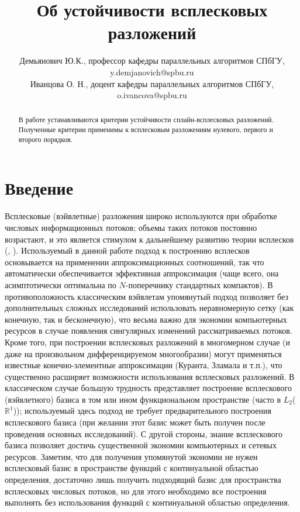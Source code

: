 \documentclass{spisok-article}
\title{Об устойчивости всплесковых разложений}
\author{Демьянович Ю.К., профессор кафедры параллельных алгоритмов СПбГУ, y.demjanovich@spbu.ru\\
  Иванцова О. Н., доцент кафедры параллельных алгоритмов СПбГУ, o.ivancova@spbu.ru
}
\begin{document}
\maketitle

\begin{abstract}
В работе устанавливаются критерии устойчивости сплайн-всплесковых разложений. Полученные критерии применимы к всплесковым разложениям нулевого, первого и второго порядков.
\end{abstract}


\def\defabove{\raise3pt\hbox {${{\lower2pt  \hbox {${\scriptscriptstyle {\rm def}}$}}}  \atop = $}}

\def\aa{\hbox{\rm \bf a}}
\def\bb{\hbox{\rm \bf b}}
\def\cc{\hbox{\rm \bf c}}



\section{Введение}

Всплесковые (вэйвлетные) разложения широко используются при обработке числовых информационных потоков; объемы таких потоков постоянно возрастают, и это является стимулом к дальнейшему развитию теории всплесков (\cite{dem2003}, \cite{dem2013}). Используемый в данной работе подход к построению всплесков основывается на применении аппроксимационных соотношений, так что автоматически обеспечивается эффективная аппроксимация (чаще всего, она асимптотически оптимальна по $N$-поперечнику стандартных компактов). В противоположность классическим вэйвлетам  упомянутый подход позволяет без дополнительных сложных исследований использовать неравномерную сетку (как конечную, так и бесконечную), что весьма важно для экономии компьютерных ресурсов в случае появления сингулярных изменений рассматриваемых потоков. Кроме того, при построении всплесковых разложений в многомерном случае (и даже на произвольном дифференцируемом многообразии) могут применяться известные конечно-элементные аппроксимации (Куранта, Зламала и т.п.), что существенно расширяет возможности использования всплесковых разложений. В классическом случае большую трудность представляет построение всплескового (вэйвлетного) базиса в том или ином функциональном пространстве (часто в $L_2$(${  \mathbb{\mathbb{R}}}^1$)); используемый здесь подход не требует предварительного построения всплескового базиса (при желании этот базис может быть получен после проведения основных исследований). С другой стороны, знание всплескового базиса позволяет достичь существенной экономии компьютерных и сетевых ресурсов. Заметим, что для получения упомянутой экономии не нужен всплесковый базис в пространстве функций с континуальной областью определения, достаточно лишь получить подходящий базис для пространства всплесковых числовых потоков, но для этого необходимо все построения выполнять без использования функций с континуальной областью определения. 
\end{document}
